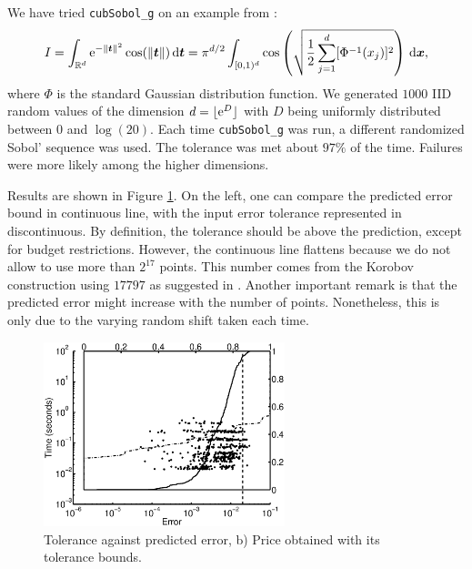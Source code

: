 \documentclass[graybox]{svmult}
\newcommand{\R}{\mathbb{R}} %
\newcommand{\bst}{\boldsymbol{t}}    %
\newcommand{\bsx}{\boldsymbol{x}}    %
\begin{document}
We have tried \texttt{cubSobol\_g} on an example from \cite{Kei96}:
\begin{equation} \label{KeisterEx}
I=\int_{\R^d} \E^{-\norm{\bst}^2} \cos(\norm{\bst}) \, \D \bst 
= \pi^{d/2}\int_{\cube} \cos\left(\sqrt{\frac 12 \sum_{j=1}^d [\Phi^{-1}(x_j)]^2} \right) \, \D \bsx,
\end{equation}
where $\Phi$ is the standard Gaussian distribution function.  We generated $1000$ IID random values of the dimension $d=\lfloor \mathrm{e}^D \rfloor$ with $D$ being uniformly distributed between $0$ and $\log(20)$.  Each time \texttt{cubSobol\_g} was run, a different randomized Sobol' sequence was used.  The tolerance was met about $97\%$ of the time.  Failures were more likely among the higher dimensions.

Results are shown in Figure \ref{geoAsianmean}. On the left, one can compare the predicted error bound in continuous line, with the input error tolerance represented in discontinuous. By definition, the tolerance should be above the prediction, except for budget restrictions. However, the continuous line flattens because we do not allow to use more than $2^{17}$ points. This number comes from the Korobov construction using $17797$ as suggested in \cite{HicEtal00}. Another important remark is that the predicted error might increase with the number of points. Nonetheless, this is only due to the varying random shift taken each time.

\begin{figure}[h!]
\centering
\includegraphics[width=7cm]{Images/geomeancubLatticeErrTime_d_64.eps} 
\caption{Tolerance against predicted error, b) Price obtained with its tolerance bounds. \label{geoAsianmean}}
\end{figure}
\end{document}
